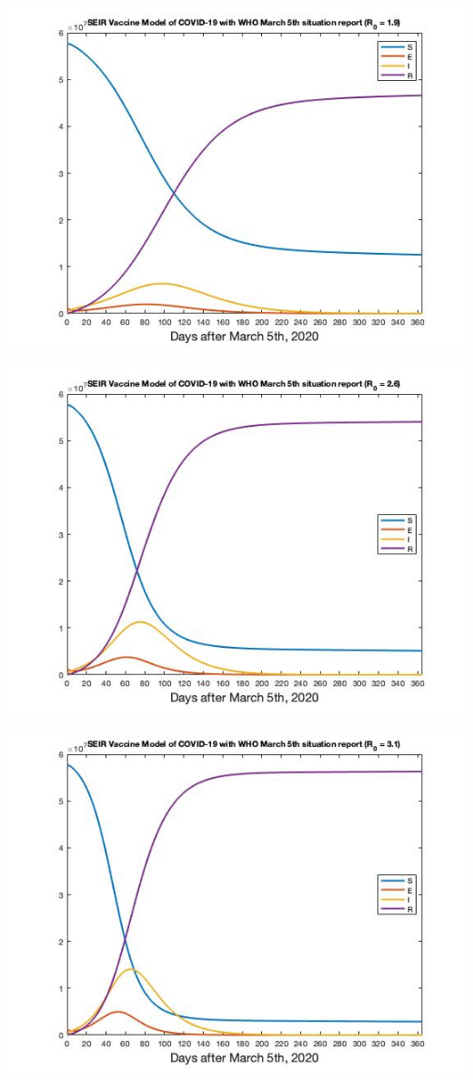 \documentclass[12pt, a4paper]{article}
\begin{document}
    \includegraphics[scale=0.75]{plots/whoseirv19.jpg}
    
    \includegraphics[scale=0.75]{plots/whoseirv26.jpg}
    
    \includegraphics[scale=0.75]{plots/whoseirv31.jpg}
    
\end{document}
